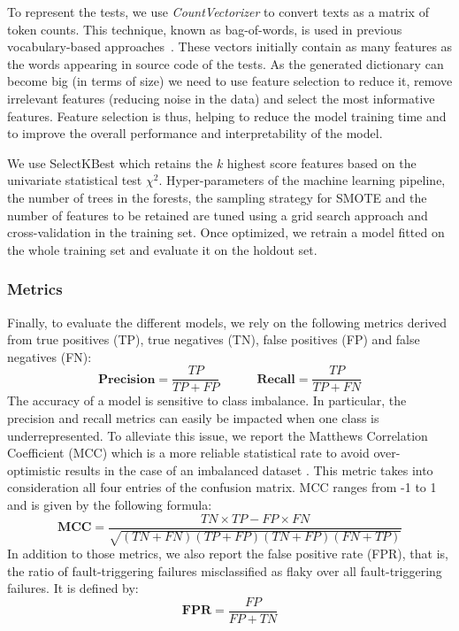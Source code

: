 To represent the tests, we use \textit{CountVectorizer} to convert texts as a matrix of token counts. This technique, known as bag-of-words, is used in previous vocabulary-based approaches~\cite{Pinto2020,Haben2021,Camara2021VocabExtendedReplication,Bertolino2020,olewickiBrown}. These vectors initially contain as many features as the words appearing in source code of the tests. As the generated dictionary can become big (in terms of size) we need to use feature selection to reduce it, remove irrelevant features (reducing noise in the data) and select the most informative features. Feature selection is thus, helping to reduce the model training time and to improve the overall performance and interpretability of the model. 

We use SelectKBest\cite{selectkbest} which retains the $k$ highest score features based on the univariate statistical test $\chi^2$.
Hyper-parameters of the machine learning pipeline, \ie the number of trees in the forests, the sampling strategy for SMOTE and the number of features to be retained are tuned using a grid search approach and cross-validation in the training set. Once optimized, we retrain a model fitted on the whole training set and evaluate it on the holdout set.

\subsubsection{Metrics}
Finally, to evaluate the different models, we rely on the following metrics derived from true positives (TP), true negatives (TN), false positives (FP) and false negatives (FN):
    \[
    \textbf{Precision} = \frac{TP}{TP+FP} \quad \quad \quad \textbf{Recall} = \frac{TP}{TP+FN}
    \]
The accuracy of a model is sensitive to class imbalance. In particular, the precision and recall metrics can easily be impacted when one class is underrepresented. To alleviate this issue, we report the Matthews Correlation Coefficient (MCC) which is a more reliable statistical rate to avoid over-optimistic results in the case of an imbalanced dataset \cite{chicco2020advantages}.
This metric takes into consideration all four entries of the confusion matrix. MCC ranges from -1 to 1 and is given by the following formula: 
    \[
    \textbf{MCC} = \frac{TN \times TP - FP \times FN}{\sqrt{(TN+FN)(TP+FP)(TN+FP)(FN+TP)}}
    \]
In addition to those metrics, we also report the false positive rate (FPR), that is, the ratio of fault-triggering failures misclassified as flaky over all fault-triggering failures. It is defined by:
    \[
    \textbf{FPR} = \frac{FP}{FP+TN}
    \]
